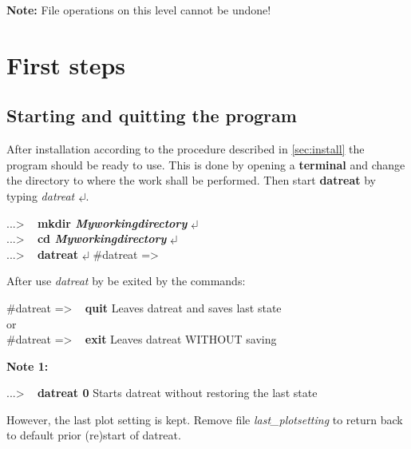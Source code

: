 \documentclass[11pt,fleqn]{book} %
\newcommand{\linespace}{\vspace{4ex}}
\newcommand{\return}{$\carriagereturn$} %
\newcommand{\sysprompt}{{\color{green}...\textgreater} ~ }
\newcommand{\dtrprompt}{{\color{blue}\#datreat =\textgreater} ~ }
\newcommand{\enter}[1]{{\color{red} \bf #1}}
\newcommand{\expl}[1]{\hskip 0.5cm {\color{explgray} #1}}
\begin{document}
{\bf Note:} File operations on this level cannot be undone!
\chapter{First steps}
\section{Starting and quitting the program}
After installation according to the procedure described in \ref{sec:install} the program should be
ready to use. This is done by opening a \textbf{terminal} and change the directory to where the
work shall be performed. Then start \textbf{datreat} by typing \emph{datreat \return}.


\begin{corollary}
\sysprompt \enter{mkdir \emph{Myworkingdirectory}} \return \\
\sysprompt \enter{cd \emph{Myworkingdirectory}} \return \\
\sysprompt \enter{datreat }\return 
\dtrprompt
\end{corollary}

After use \emph{datreat} by be exited by the commands:
\begin{corollary}
\dtrprompt \enter{quit} \expl{Leaves datreat and saves last state} \\
or \\
\dtrprompt \enter{exit} \expl{Leaves datreat WITHOUT saving} 
\end{corollary}

\linespace

{\bf Note 1:}
\begin{corollary}
\sysprompt \enter{datreat 0} \expl{Starts datreat without restoring the last state} 
\end{corollary}
However, the last plot setting is kept. Remove file
\emph{last\_plotsetting} to return back to default prior 
(re)start of datreat.
\end{document}
